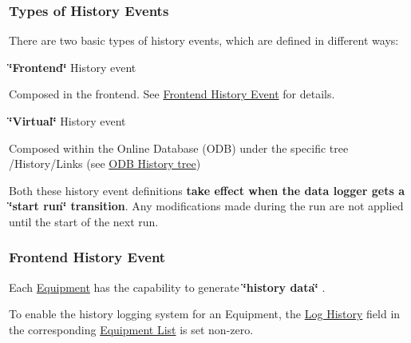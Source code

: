 \par
 

 \par
\hypertarget{F_History_logging_F_History_Event_Types}{}\subsubsection{Types of History Events}\label{F_History_logging_F_History_Event_Types}
There are two basic types of history events, which are defined in different ways:


\begin{DoxyItemize}
\item {\bfseries \char`\"{}Frontend\char`\"{}} History event \par
 Composed in the frontend. See \hyperlink{F_History_logging_F_Frontend_History_Event}{Frontend History Event} for details.


\item {\bfseries \char`\"{}Virtual\char`\"{}} History event \par
Composed within the Online Database (ODB) under the specific tree /History/Links (see \hyperlink{F_History_logging_F_ODB_History_tree}{ODB History tree})


\end{DoxyItemize}

Both these history event definitions {\bfseries take effect when the data logger gets a \char`\"{}start run\char`\"{} transition}. Any modifications made during the run are not applied until the start of the next run.

\par
 

 \par
 \label{F_History_logging_idx_History_events}
\hypertarget{F_History_logging_idx_History_events}{}
 \hypertarget{F_History_logging_F_Frontend_History_Event}{}\subsubsection{Frontend History Event}\label{F_History_logging_F_Frontend_History_Event}
Each \hyperlink{FrontendOperation_FE_sw_equipment}{Equipment} has the capability to generate {\bfseries  \char`\"{}history data\char`\"{} }. \par
   To enable the history logging system for an Equipment, the \hyperlink{FE_table_FE_tbl_History}{Log History} field in the corresponding \hyperlink{FrontendOperation_FE_Equipment_list}{Equipment List} is set non-\/zero.



